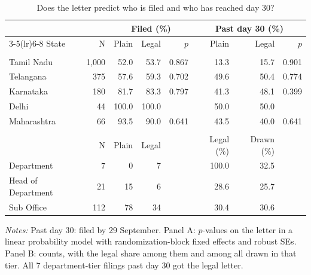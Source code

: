 \begin{table}[!htbp]
\centering
\caption{Does the letter predict who is filed and who has reached day 30?}
\label{tab:tab_balance}
\small
\begin{threeparttable}
\begin{tabular}{lrrrrrrr}
\toprule
& & \multicolumn{3}{c}{Filed (\%)} & \multicolumn{3}{c}{Past day 30 (\%)} \\ \cmidrule(lr){3-5}\cmidrule(lr){6-8} State & N & Plain & Legal & $p$ & Plain & Legal & $p$ \\
\midrule
\addlinespace\multicolumn{8}{l}{\textit{Panel A. All drawn applications}} \\
Tamil Nadu & 1,000 & 52.0 & 53.7 & 0.867 & 13.3 & 15.7 & 0.901 \\
Telangana & 375 & 57.6 & 59.3 & 0.702 & 49.6 & 50.4 & 0.774 \\
Karnataka & 180 & 81.7 & 83.3 & 0.797 & 41.3 & 48.1 & 0.399 \\
Delhi & 44 & 100.0 & 100.0 &  & 50.0 & 50.0 &  \\
Maharashtra & 66 & 93.5 & 90.0 & 0.641 & 43.5 & 40.0 & 0.641 \\
\midrule
\addlinespace\multicolumn{8}{l}{\textit{Panel B. Tamil Nadu past day 30, by tier}} \\
 & N & Plain & Legal &  & Legal (\%) & Drawn (\%) &  \\
Department & 7 & 0 & 7 &  & 100.0 & 32.5 &  \\
Head of Department & 21 & 15 & 6 &  & 28.6 & 25.7 &  \\
Sub Office & 112 & 78 & 34 &  & 30.4 & 30.6 &  \\
\bottomrule
\end{tabular}
\begin{tablenotes}[flushleft]\footnotesize
\item \textit{Notes:} Past day 30: filed by 29 September. Panel A: $p$-values on the letter in a linear probability model with randomization-block fixed effects and robust SEs. Panel B: counts, with the legal share among them and among all drawn in that tier. All 7 department-tier filings past day 30 got the legal letter.
\end{tablenotes}
\end{threeparttable}
\end{table}
